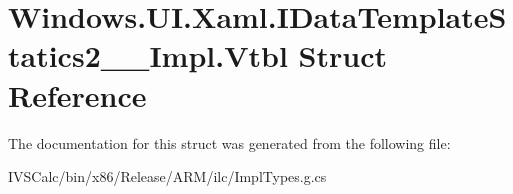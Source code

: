 \hypertarget{struct_windows_1_1_u_i_1_1_xaml_1_1_i_data_template_statics2_____impl_1_1_vtbl}{}\section{Windows.\+U\+I.\+Xaml.\+I\+Data\+Template\+Statics2\+\_\+\+\_\+\+Impl.\+Vtbl Struct Reference}
\label{struct_windows_1_1_u_i_1_1_xaml_1_1_i_data_template_statics2_____impl_1_1_vtbl}


The documentation for this struct was generated from the following file\+:\begin{DoxyCompactItemize}
\item 
I\+V\+S\+Calc/bin/x86/\+Release/\+A\+R\+M/ilc/Impl\+Types.\+g.\+cs\end{DoxyCompactItemize}
